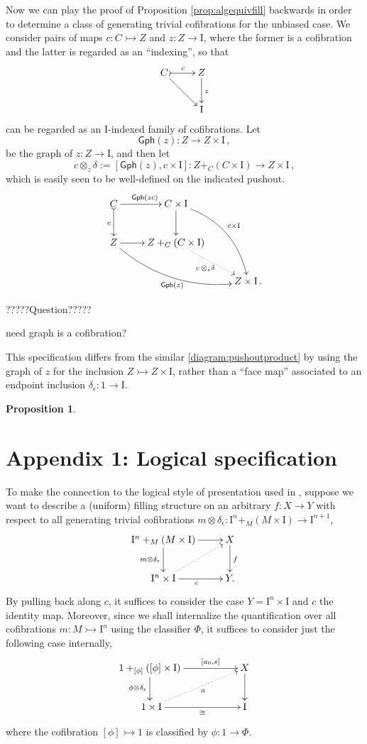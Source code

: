 \documentclass[11pt]{article}
\newcommand{\mono}{\ensuremath{\rightarrowtail}}
\newcommand{\I}{\ensuremath{\mathrm{I}}}
\newtheorem{proposition}[theorem]{Proposition}
\theoremstyle{remark}
\theoremstyle{definition}
\begin{document}
Now we can play the proof of Proposition \ref{prop:algequivfill} backwards in order to determine a class of generating trivial cofibrations for the unbiased case. We consider pairs of maps $c : C\mono Z$ and $z:Z\to\I$, where the former is a cofibration and the latter is regarded as an ``indexing'', so that
\[
\xymatrix{
C \ar[rd] \ar@{>->}[r]^{c} & Z  \ar[d]^z \\
& \I
}
\]
can be regarded as an $\I$-indexed family of cofibrations.  Let 
\[
\mathsf{Gph}(z) : Z\to Z\times\I\,,
\]
be the graph of $z : Z\to \I$, and then let
\[
c \otimes_z\!\delta := [\mathsf{Gph}(z), c\times\I] : Z+_C(C\times\I) \to Z\times \I\,,
\]
which is easily seen to be well-defined on the indicated pushout.
\begin{equation}\label{diagram:unbiasedpushoutproduct}
\xymatrix{
C \ar@{>->}[d]_{c} \ar[r]^{\mathsf{Gph}(zc)} & C\times \I \ar[d] \ar@/^4ex/ [rdd]^{c\times\I}\\
Z \ar@/_4ex/ [rrd]_{\mathsf{Gph}(z)} \ar[r] &  Z +_C (C\times\I) \ar@{.>}[rd]_{c\, \otimes_z \delta} \\
&& Z\times\I\,.
}
\end{equation}

?????Question?????

need graph is a cofibration?


This specification differs from the similar \eqref{diagram:pushoutproduct} by using the graph of $z$ for the inclusion $Z\mono Z\times\I$, rather than a ``face map'' associated to an endpoint inclusion $\delta_\epsilon : 1\to\I$. 

\begin{proposition}
\end{proposition}
\section*{Appendix 1: Logical specification}

To make the connection to the logical style of presentation used in \cite{CCHM,OP}, suppose we want to describe a (uniform) filling structure on an arbitrary $f : X\to Y$ with respect to all generating trivial cofibrations $m \otimes \delta_\epsilon : \I^n +_M (M\times\I) \to \I^{n+1}$,
\begin{equation}\label{diagram:llpforf}
\xymatrix{
\I^n +_M (M\times\I) \ar[d]_{m \otimes \delta_\epsilon} \ar[r] & X \ar[d]^f \\
\I^{n}\times \I \ar@{.>}[ru] \ar[r]_c & Y.
}
\end{equation}
By pulling back along $c$, it suffices to consider  the case $Y=\I^{n}\times \I$ and $c$ the identity map. Moreover, since we shall internalize the quantification over all cofibrations $m : M\mono \I^n$ using the classifier $\Phi$, it suffices to consider just the following case internally,
\begin{equation}\label{diagram:llpforf2}
\xymatrix{
1 +_{[\phi]} ([\phi]\times\I) \ar[d]_{\phi \otimes \delta_\epsilon} \ar[rr]^-{[a_0,s]} && X \ar[d] \\\
1\times\I \ar@{.>}[rru]_-a \ar[rr]_-{\cong} && \I
}
\end{equation}
where the cofibration $[\phi] \mono 1$ is classified by $\phi : 1\rightarrow \Phi$.
\end{document}
